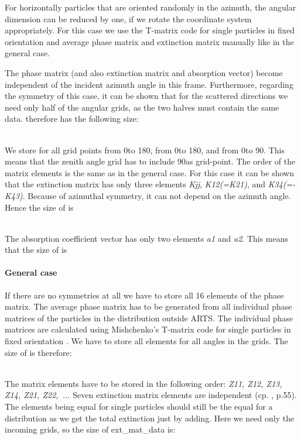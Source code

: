 For horizontally particles
that are oriented randomly in the azimuth, the angular dimension can be
reduced by one, if we rotate the coordinate system appropriately. For
this case we use the T-matrix code for single particles in fixed
orientation and average phase matrix and extinction matrix manually
like in the general case.

The phase matrix (and also extinction matrix and absorption vector)
become independent of the incident azimuth angle in this
frame. Furthermore, regarding the symmetry of this case, it can be
shown that for the scattered directions we need only half of the
angular grids, as the two halves must contain the same
data.  therefore has the following size:

\\
We store  for all grid points from 0\degree to 180\degree,
 from 0\degree to 
180\degree, and  from 0\degree to 90\degree. This means that the
zenith angle grid 
has to include 90\degree as grid-point. The order of the matrix elements is
the same as in the general case. For this case it can be shown that the extinction matrix has only
three elements {\sl Kjj}, {\sl K12(=K21)}, and {\sl K34(=-K43)}. 
Because of azimuthal symmetry, it can not depend on the azimuth
angle. Hence the size of  is 

\shortcode{[N\_f N\_T N\_za/2+1 1 3]}\\
The absorption coefficient vector has only two elements {\sl a1} and
{\sl a2}. This means that the size of  is 

\shortcode{[N\_f N\_T N\_za/2+1 1 2]}

\paragraph{General case}

If there are no symmetries at all we have to store all 16 elements of
the phase matrix. The average phase matrix has to be generated from
all individual phase matrices of the particles in the distribution
outside ARTS. The individual phase matrices are calculated using
Mishchenko's T-matrix code for single particles in fixed orientation
\citep{Mishchenko:00}. 
We have to store all elements for all angles in the grids. The size of
 is therefore: 

\\
The matrix elements have to be stored in the following order: {\sl Z11,
  Z12, Z13, Z14, Z21, Z22,~...} Seven extinction matrix elements are
independent (cp. \citet{Mishchenko:02}, p.55). The elements being equal for
single particles should still be the equal for a distribution as we
get the total extinction just by adding. Here we need only the
incoming grids, so the size of ext\_mat\_data is: 

